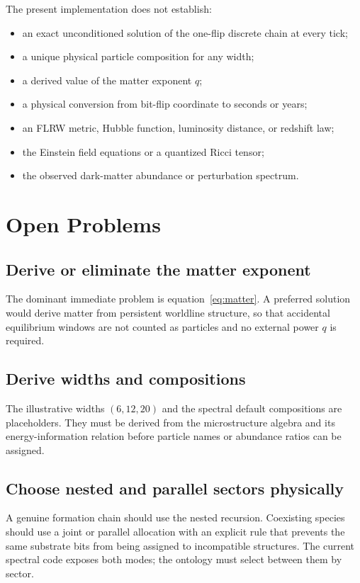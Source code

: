 \documentclass[11pt]{article}
\begin{document}
The present implementation does not establish:
\begin{itemize}
  \item an exact unconditioned solution of the one-flip discrete chain at
        every tick;
  \item a unique physical particle composition for any width;
  \item a derived value of the matter exponent $q$;
  \item a physical conversion from bit-flip coordinate to seconds or years;
  \item an FLRW metric, Hubble function, luminosity distance, or redshift law;
  \item the Einstein field equations or a quantized Ricci tensor;
  \item the observed dark-matter abundance or perturbation spectrum.
\end{itemize}

\section{Open Problems}
\label{sec:open}

\subsection*{Derive or eliminate the matter exponent}
The dominant immediate problem is equation~\eqref{eq:matter}.  A preferred
solution would derive matter from persistent worldline structure, so that
accidental equilibrium windows are not counted as particles and no external
power $q$ is required.

\subsection*{Derive widths and compositions}
The illustrative widths $(6,12,20)$ and the spectral default compositions
are placeholders.  They must be derived from the microstructure algebra and
its energy-information relation before particle names or abundance ratios
can be assigned.

\subsection*{Choose nested and parallel sectors physically}
A genuine formation chain should use the nested recursion.  Coexisting
species should use a joint or parallel allocation with an explicit rule that
prevents the same substrate bits from being assigned to incompatible
structures.  The current spectral code exposes both modes; the ontology must
select between them by sector.
\end{document}
